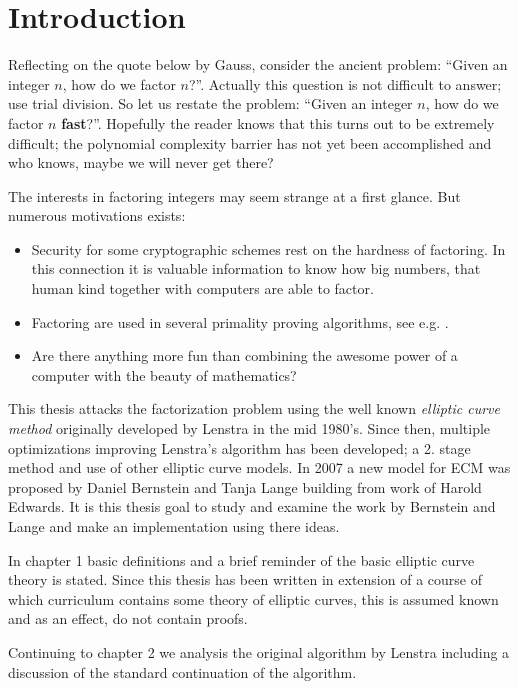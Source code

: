 \chapter{Introduction}

Reflecting on the quote below by Gauss, consider the ancient problem: ``Given an integer $n$, how do we factor $n$?''. Actually this question is not difficult to answer; use trial division. So let us restate the problem: ``Given an integer $n$, how do we factor $n$ \textbf{fast}?''. Hopefully the reader knows that this turns out to be extremely difficult; the polynomial complexity barrier has not yet been accomplished and who knows, maybe we will never get there?

The interests in factoring integers may seem strange at a first glance. But numerous motivations exists: 
\begin{itemize}
\item Security for some cryptographic schemes rest on the hardness of factoring. In this connection it is valuable information to know how big numbers, that human kind together with computers are able to factor.
\item Factoring are used in several primality proving algorithms, see e.g. \cite{pomeranceEt.al}.
\item Are there anything more fun than combining the awesome power of a computer with the beauty of mathematics?
\end{itemize}

This thesis attacks the factorization problem using the well known \textit{elliptic curve method} originally developed by Lenstra in the mid 1980's. Since then, multiple optimizations improving Lenstra's algorithm has been developed; a 2. stage method and use of other elliptic curve models. In 2007 a new model for ECM was proposed by Daniel Bernstein and Tanja Lange building from work of Harold Edwards. It is this thesis goal to study and examine the work by Bernstein and Lange and make an implementation using there ideas.

In chapter 1 basic definitions and a brief reminder of the basic elliptic curve theory is stated. Since this thesis has been written in extension of a course of which curriculum contains some theory of elliptic curves, this is assumed known and as an effect, do not contain proofs. 

Continuing to chapter 2 we analysis the original algorithm by Lenstra including a discussion of the standard continuation of the algorithm.  

